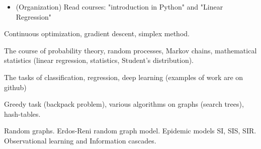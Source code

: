 \documentclass[10pt,a4paper,ragged2e]{altacv}
\begin{document}
\begin{itemize}
\item (Organization) Read courses: "introduction in Python" and "Linear Regression"
\end{itemize}

\divider



Continuous optimization, gradient descent, simplex method. 


The course of probability theory, random processes, Markov chains, mathematical statistics (linear regression, statistics, Student’s distribution).


The tasks of classification, regression, deep learning (examples of work are on github)


Greedy task (backpack problem), various algorithms on graphs (search trees), hash-tables.

Random graphs. Erdos-Reni random graph model. Epidemic models SI, SIS, SIR. Observational learning and Information cascades.

\divider




\clearpage
\end{document}
